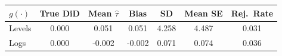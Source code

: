 \begin{tabular}{lcccccc}
  \toprule
$g(\cdot)$ & True DiD & Mean $\hat{\tau}$ & Bias & SD & Mean SE & Rej.\ Rate \\ 
  \midrule
Levels & 0.000 & 0.051 & 0.051 & 4.258 & 4.487 & 0.031 \\ 
  Logs & 0.000 & -0.002 & -0.002 & 0.071 & 0.074 & 0.036 \\ 
   \bottomrule
\end{tabular}
